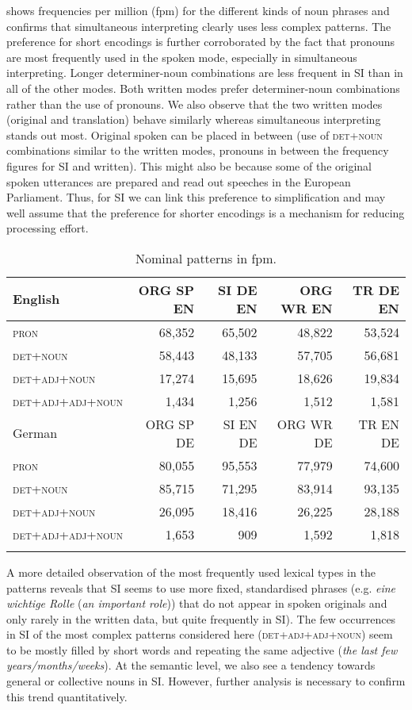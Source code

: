 \documentclass[output=paper,colorlinks,citecolor=brown]{langscibook}
\begin{document}
 shows frequencies per million (fpm) for the different kinds of noun phrases and confirms that simultaneous interpreting clearly uses less complex patterns. The preference for short encodings is further corroborated by the fact that pronouns are most frequently used in the spoken mode, especially in simultaneous interpreting. Longer determiner-noun combinations are less frequent in SI than in all of the other modes. Both written modes prefer determiner-noun combinations rather than the use of pronouns. We also observe that the two written modes (original and translation) behave similarly whereas simultaneous interpreting stands out most. Original spoken can be placed in between (use of \textsc{det+noun} combinations similar to the written modes, pronouns in between the frequency figures for SI and written). This might also be because some of the original spoken utterances are prepared and read out speeches in the European Parliament. 
Thus, for SI we can link this preference to simplification and may well assume that the preference for shorter encodings is a mechanism for reducing processing effort.

\begin{table}
\begin{tabular}{l rrrr}
\lsptoprule
English & ORG SP EN & SI DE EN & ORG WR EN & TR DE EN \\\midrule
\textsc{pron} & 68,352 & 65,502 & 48,822 & 53,524 \\
\textsc{det+noun} & 58,443 & 48,133 & 57,705 & 56,681 \\
\textsc{det+adj+noun} & 17,274 & 15,695 & 18,626 & 19,834 \\
\textsc{det+adj+adj+noun}  &	1,434  &	1,256 & 1,512 &	1,581 \\\midrule
German & ORG SP DE & SI EN DE & ORG WR DE & TR EN DE \\\midrule
\textsc{pron} &	80,055 & 95,553 &	77,979 & 74,600 \\
\textsc{det+noun} &	85,715 & 71,295 & 83,914 & 93,135 \\
\textsc{det+adj+noun} & 26,095 & 18,416 & 26,225 & 28,188 \\
\textsc{det+adj+adj+noun} & 1,653 & 909 & 1,592 & 1,818\\
\lspbottomrule
\end{tabular}
\caption{\label{tab:NP_fpm}Nominal patterns in fpm.}
\end{table}

A more detailed observation of the most frequently used lexical types in the patterns reveals that SI seems to use more fixed, standardised phrases (e.g. \textit{eine wichtige Rolle} (\textit{an important role})) that do not appear in spoken originals and only rarely in the written data, but quite frequently in SI). The few occurrences in SI of the most complex patterns considered here (\textsc{det+adj+adj+noun}) seem to be mostly filled by short words and repeating the same adjective (\textit{the last few years/months/weeks}). At the semantic level, we also see a tendency towards general or collective nouns in SI. However, further analysis is necessary to confirm this trend quantitatively. 
\end{document}
